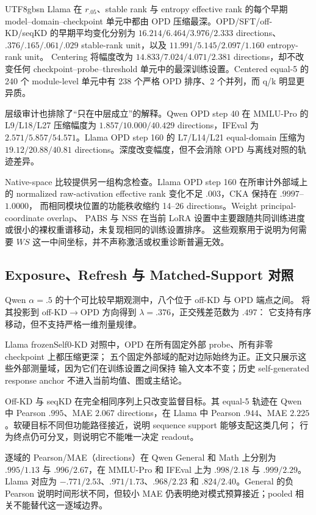 \documentclass[letterpaper]{article} %
\begin{document}
\begin{CJK*}{UTF8}{gbsn}
Llama 在 $r_{.05}$、stable rank 与 entropy effective rank 的每个早期
model--domain--checkpoint 单元中都由 OPD 压缩最深。OPD/SFT/off-KD/seqKD 的早期平均变化分别为
$16.214/6.464/3.976/2.333$ directions、
$.376/.165/.061/.029$ stable-rank unit，以及
$11.991/5.145/2.097/1.160$ entropy-rank unit。
Centering 将幅度改为 $14.833/7.024/4.071/2.381$ directions，却不改变任何
checkpoint--probe--threshold 单元中的最深训练设置。Centered equal-5 的 240 个
module-level 单元中有 238 个严格 OPD 排序、2 个并列，而 q/k 明显更异质。

层级审计也排除了“只在中层成立”的解释。Qwen OPD step 40 在 MMLU-Pro 的
L9/L18/L27 压缩幅度为 $1.857/10.000/40.429$ directions，IFEval 为
$2.571/5.857/54.571$。Llama OPD step 160 的 L7/L14/L21 equal-domain 压缩为
$19.12/20.88/40.81$ directions。深度改变幅度，但不会消除 OPD 与离线对照的轨迹差异。

Native-space 比较提供另一组构念检查。Llama OPD step 160 在所审计外部域上的 normalized
raw-activation effective rank 变化不足 $.003$，CKA 保持在 $.9997$--$1.0000$，
而相同模块位置的功能秩收缩约 14--26 directions。Weight principal-coordinate overlap、
PABS 与 NSS 在当前 LoRA 设置中主要跟随共同训练进度或很小的裸权重谱移动，未复现相同的训练设置排序。
这些观察用于说明为何需要 $WS$ 这一中间坐标，并不声称激活或权重诊断普遍无效。

\subsection{Exposure、Refresh 与 Matched-Support 对照}

Qwen $\alpha=.5$ 的十个可比较早期观测中，八个位于 off-KD 与 OPD 端点之间。
将其投影到 off-KD$\rightarrow$OPD 方向得到 $\lambda=.376$，正交残差范数为 $.497$：
它支持有序移动，但不支持严格一维剂量规律。

Llama frozenSelf0-KD 对照中，OPD 在所有固定外部 probe、所有非零 checkpoint 上都压缩更深；
五个固定外部域的配对边际始终为正。正文只展示这些外部测量域，因为它们在训练设置之间保持
输入文本不变；历史 self-generated response anchor 不进入当前均值、图或主结论。

Off-KD 与 seqKD 在完全相同序列上只改变监督目标。其 equal-5 轨迹在 Qwen 中
Pearson $.995$、MAE $2.067$ directions，在 Llama 中 Pearson $.944$、MAE
$2.225$。软硬目标不同但功能路径接近，说明 sequence support 能够支配这类几何；
行为终点仍可分叉，则说明它不能唯一决定 readout。

逐域的 Pearson/MAE（directions）在 Qwen General 和 Math 上分别为 $.995/1.13$ 与
$.996/2.67$，在 MMLU-Pro 和 IFEval 上为 $.998/2.18$ 与 $.999/2.29$。
Llama 对应为 $-.771/2.53$、$.971/1.73$、$.968/2.23$ 和 $.824/2.40$。General 的负 Pearson
说明时间形状不同，但较小 MAE 仍表明绝对模式预算接近；pooled 相关不能替代这一逐域边界。


\end{CJK*}
\end{document}
